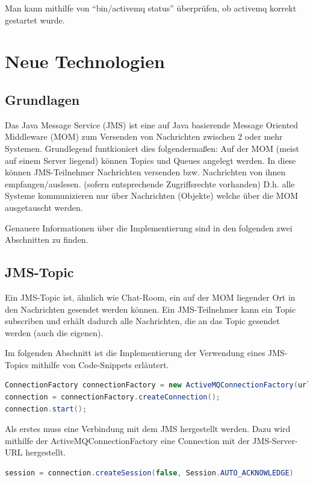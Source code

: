 \documentclass[11pt, a4paper]{article}
\begin{document}
Man kann mithilfe von ``bin/activemq status'' überprüfen, ob activemq korrekt gestartet wurde.

\newpage

\section{Neue Technologien}
\subsection{Grundlagen}
Das Java Message Service (JMS) \cite{activemqtut1} ist eine auf Java basierende Message Oriented Middleware (MOM) zum Versenden von Nachrichten zwischen 2 oder mehr Systemen.
Grundlegend funtkioniert dies folgendermaßen:
Auf der MOM (meist auf einem Server liegend) können Topics und Queues angelegt werden.
In diese können JMS-Teilnehmer Nachrichten versenden bzw. Nachrichten von ihnen empfangen/auslesen. (sofern entsprechende Zugriffsrechte vorhanden)
D.h. alle Systeme kommunizieren nur über Nachrichten (Objekte) welche über die MOM ausgetauscht werden.

Genauere Informationen über die Implementierung sind in den folgenden zwei Abschnitten zu finden.

\subsection{JMS-Topic}
Ein JMS-Topic ist, ähnlich wie Chat-Room, ein auf der MOM liegender Ort in den Nachrichten gesendet werden können. Ein JMS-Teilnehmer kann ein Topic
subscriben und erhält dadurch alle Nachrichten, die an das Topic gesendet werden (auch die eigenen).

Im folgenden Abschnitt ist die Implementierung der Verwendung eines JMS-Topics mithilfe von Code-Snippets erläutert.

\begin{lstlisting}[language=Java]
ConnectionFactory connectionFactory = new ActiveMQConnectionFactory(url);
connection = connectionFactory.createConnection();
connection.start();
\end{lstlisting}

Als erstes muss eine Verbindung mit dem JMS hergestellt werden. Dazu wird mithilfe der ActiveMQConnectionFactory eine Connection mit der JMS-Server-URL
hergestellt.

\begin{lstlisting}[language=Java]
session = connection.createSession(false, Session.AUTO_ACKNOWLEDGE)
\end{lstlisting}
\end{document}

